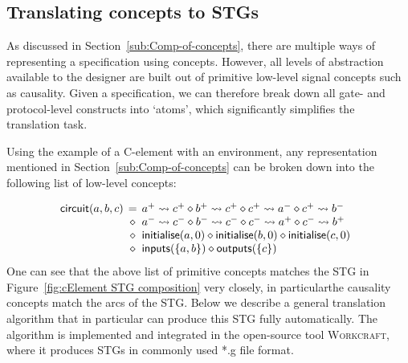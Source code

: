 \documentclass[british, journal]{IEEEtran}
\newcommand{\noun}[1]{\textsc{#1}}
\begin{document}
\vspace{-2mm}
\subsection{Translating concepts to STGs\label{sub:translating}}

As discussed in Section~\ref{sub:Comp-of-concepts}, there are multiple ways of
representing a specification using concepts. However, all levels of
abstraction available to the designer are built out of primitive low-level
signal concepts such as causality. Given a specification, we can therefore
break down all gate- and protocol-level constructs into `atoms', which
significantly simplifies the translation task.

Using the example of a C-element with an environment, any representation
mentioned in Section~\ref{sub:Comp-of-concepts} can be broken down into the
following
list of low-level concepts:

\vspace{-3mm}
\[
\begin{array}{lcl}
\hspace{-2mm}\mathsf{circuit}(a,b,c)&\hspace{-2mm}=&\hspace{-2mm}a^{+}\rightsquigarrow
c^{+} \diamond b^{+}\rightsquigarrow c^{+} \diamond c^{+}\rightsquigarrow a^{-}
\diamond c^{+}
\rightsquigarrow b^{-}\\
~&\hspace{-2mm}\diamond&\hspace{-2mm}a^{-}\rightsquigarrow c^{-} \diamond
b^{-}\rightsquigarrow c^{-} \diamond c^{-}\rightsquigarrow a^{+} \diamond
c^{-}\rightsquigarrow b^{+}\\
~&\hspace{-2mm}\diamond&\hspace{-2mm}\mathsf{initialise}(a,0) \diamond
\mathsf{initialise}(b,0) \diamond \mathsf{initialise}(c,0)\\
~&\hspace{-2mm}\diamond&\hspace{-2mm}\mathsf{inputs}(\{a,b\})\diamond\mathsf{outputs}(\{c\})
\end{array}
\]
\vspace{2mm}
\noindent One can see that the above list of primitive concepts matches
the STG in Figure~\ref{fig:cElement STG composition} very closely, in particularthe causality concepts match the arcs of the STG. Below we describe a general
translation algorithm that in particular can produce this STG fully
automatically.
The algorithm is implemented and integrated in the open-source tool
\noun{Workcraft},
where it produces STGs in commonly used \textsf{*.g} file format.
\end{document}
